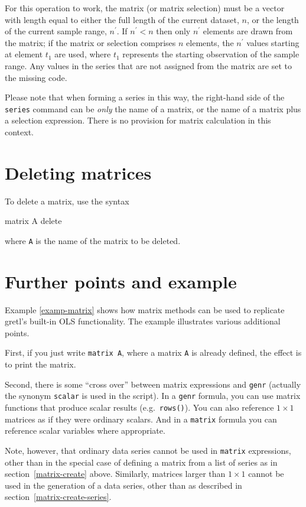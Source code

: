For this operation to work, the matrix (or matrix selection) must be a
vector with length equal to either the full length of the current
dataset, $n$, or the length of the current sample range, $n^{\prime}$.
If $n^{\prime} < n$ then only $n^{\prime}$ elements are drawn from the
matrix; if the matrix or selection comprises $n$ elements, the
$n^{\prime}$ values starting at element $t_1$ are used, where $t_1$
represents the starting observation of the sample range.  Any values
in the series that are not assigned from the matrix are set to the
missing code.
 
Please note that when forming a series in this way, the right-hand
side of the \texttt{series} command can be \textit{only} the name of a
matrix, or the name of a matrix plus a selection expression.  There is
no provision for matrix calculation in this context.

\section{Deleting matrices}
\label{matrix-delete}

To delete a matrix, use the syntax
%
\begin{code}
matrix A delete
\end{code}
%
where \texttt{A} is the name of the matrix to be deleted.

\section{Further points and example}
\label{matrix-example}

Example \ref{examp-matrix} shows how matrix methods can be used to
replicate gretl's built-in OLS functionality.  The example illustrates
various additional points.  

First, if you just write \texttt{matrix A}, where a matrix \texttt{A}
is already defined, the effect is to print the matrix.

Second, there is some ``cross over'' between matrix expressions and
\texttt{genr} (actually the synonym \texttt{scalar} is used in the
script).  In a \texttt{genr} formula, you can use matrix functions
that produce scalar results (e.g.\ \texttt{rows()}).  You can also
reference $1\times 1$ matrices as if they were ordinary scalars.  And
in a \texttt{matrix} formula you can reference scalar variables where
appropriate.  

Note, however, that ordinary data series cannot be used in
\texttt{matrix} expressions, other than in the special case of
defining a matrix from a list of series as in
section~\ref{matrix-create} above.  Similarly, matrices larger than
$1\times 1$ cannot be used in the generation of a data series,
other than as described in section~\ref{matrix-create-series}.

